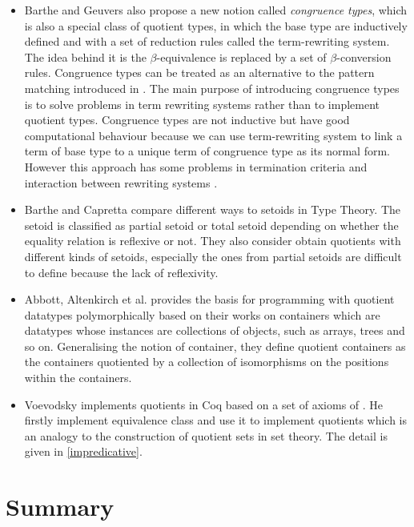 \begin{itemize}
\item Barthe and Geuvers \cite{bar:96} also propose a new notion called
\emph{congruence types}, which is also a special class of quotient
types, in which the base type are inductively defined and with a set
of reduction rules called the term-rewriting system. The idea behind
it is the $\beta$-equivalence is replaced by a set of
$\beta$-conversion rules. Congruence types can be treated as an
alternative to the pattern matching introduced in \cite{coq:92}. The main
purpose of introducing congruence types is to solve problems in
term rewriting systems rather than to implement quotient types.
Congruence types are not inductive but have good computational behaviour because we can use term-rewriting system to link a term of base type to a unique term of congruence type as its normal form.
However this approach has some problems in termination criteria and interaction between rewriting systems \cite{cou:01}.

\item Barthe and Capretta \cite{bar:03} compare different ways to setoids in Type Theory.
The setoid is classified as partial setoid or total setoid depending
on whether the equality relation is reflexive or not. They also
consider obtain quotients with different kinds of setoids, especially
the ones from partial setoids are difficult to define because the lack
of reflexivity.

\item Abbott, Altenkirch et al. \cite{abb:04} provides the basis for
programming with quotient datatypes polymorphically based on their
works on containers which are datatypes whose instances are
collections of objects, such as arrays, trees and so on. Generalising
the notion of container, they define quotient containers as the
containers quotiented by a collection of isomorphisms on the positions
within the containers.

\item Voevodsky \cite{voe:hset} implements quotients in Coq based on a set
of axioms of \hott. He firstly implement
equivalence class and use it to implement quotients which is an
analogy to the construction of quotient sets in set theory. The detail is given in \autoref{impredicative}.
\end{itemize}





\section{Summary}

